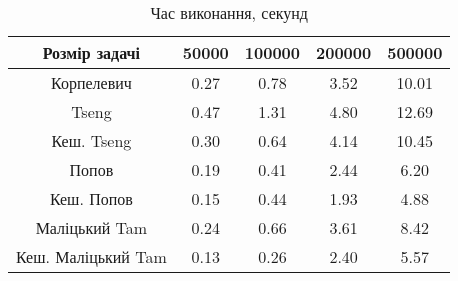 \begin{table}[H]
	\centering
	\begin{tabular}{|c||c|c|c|c|}\hline
		Розмір задачі & 50000 & 100000 & 200000 & 500000 \\ \hline \hline
		Корпелевич & 0.27 & 0.78 & 3.52 & 10.01 \\ \hline
		Tseng & 0.47 & 1.31 & 4.80 & 12.69 \\ \hline
		Кеш. Tseng & 0.30 & 0.64 & 4.14 & 10.45 \\ \hline
		Попов & 0.19 & 0.41 & 2.44 & 6.20 \\ \hline
		Кеш. Попов & 0.15 & 0.44 & 1.93 & 4.88 \\ \hline
		Маліцький Tam & 0.24 & 0.66 & 3.61 & 8.42 \\ \hline
		Кеш. Маліцький Tam & 0.13 & 0.26 & 2.40 & 5.57 \\ \hline
	\end{tabular}
	\caption{Час виконання, секунд}
\end{table}
